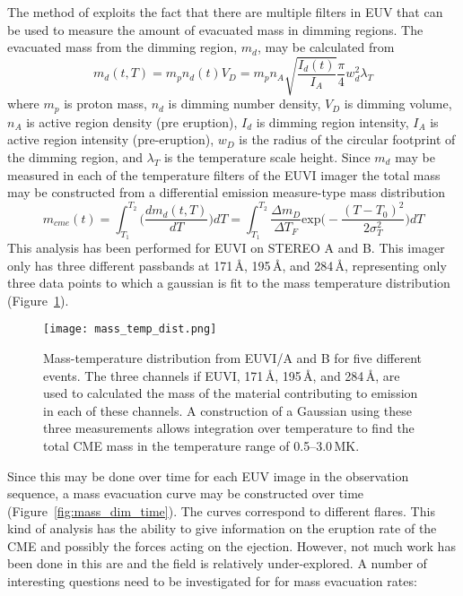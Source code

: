 The method of \citet{aschw09} exploits the fact that there are multiple filters in EUV that can be used to measure the amount of evacuated mass in dimming regions. The evacuated mass from the dimming region, $m_d$, may be calculated from
\begin{equation}
m_d(t,T) = m_p n_d(t)V_D = m_p n_A\sqrt{\frac{I_d(t)}{I_A}}\frac{\pi}{4}w_d^2\lambda_T
\end{equation}
where $m_p$ is proton mass, $n_d$ is dimming number density, $V_D$ is dimming volume, $n_A$ is active region density (pre eruption), $I_d$ is dimming region intensity, $I_A$ is active region intensity (pre-eruption), $w_D$ is the radius of the circular footprint of the dimming region, and $\lambda_T$ is the temperature scale height. Since $m_d$ may be measured in each of the temperature filters of the EUVI imager the total mass may be constructed from a differential emission measure-type mass distribution
\begin{equation}
m_{cme}(t)=\int_{T_1}^{T_2}\bigg( \frac{dm_d(t,T)}{dT} \bigg)dT = \int_{T_1}^{T_2}\frac{\Delta m_D}{\Delta T_F}\mathrm{exp}\bigg( -\frac{(T-T_0)^2}{2\sigma_T^2} \bigg)dT
\label{eqn:tot_euv_mass}
\end{equation}
This analysis has been performed for EUVI on STEREO A and B. This imager only has three different passbands at 171\,\AA, 195\,\AA, and 284\,\AA, representing only three data points to which a gaussian is fit to the mass temperature distribution (Figure~\ref{fig:euvi_mass}).
\begin{figure}[t!]
\begin{center}
\texttt{[image: mass\_temp\_dist.png]}
\caption[Mass-temperature distribution]{Mass-temperature distribution from EUVI/A and B for five different events. The three channels if EUVI, 171\,\AA, 195\,\AA, and 284\,\AA, are used to calculated the mass of the material contributing to emission in each of these channels. A construction of a Gaussian using these three measurements allows integration over temperature to find the total CME mass in the temperature range of 0.5--3.0\,MK. \citep{aschw09}}
\label{fig:euvi_mass}
\end{center}
\end{figure}
Since this may be done over time for each EUV image in the observation sequence, a mass evacuation curve may be constructed over time (Figure~\ref{fig:mass_dim_time}). The curves correspond to different flares. This kind of analysis has the ability to give information on the eruption rate of the CME and possibly the forces acting on the ejection. However, not much work has been done in this are and the field is relatively under-explored. A number of interesting questions need to be investigated for for mass evacuation rates:
